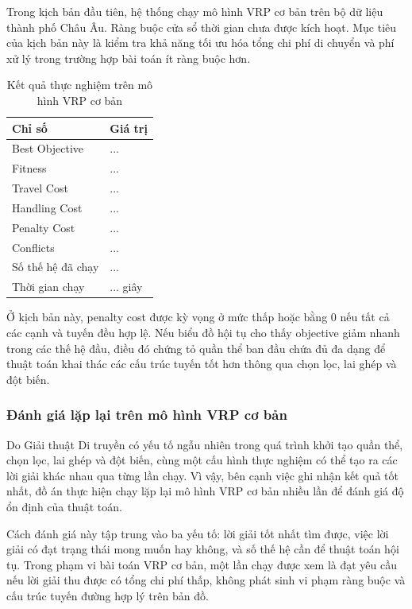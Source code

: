 \documentclass[12pt,a4paper]{article}
\numberwithin{figure}{subsection}
\begin{document}
Trong kịch bản đầu tiên, hệ thống chạy mô hình VRP cơ bản trên bộ dữ liệu thành phố Châu Âu. Ràng buộc cửa sổ thời gian chưa được kích hoạt. Mục tiêu của kịch bản này là kiểm tra khả năng tối ưu hóa tổng chi phí di chuyển và phí xử lý trong trường hợp bài toán ít ràng buộc hơn.

\begin{table}[H]
    \centering
    \caption{Kết quả thực nghiệm trên mô hình VRP cơ bản}
    \label{tab:basic_vrp_result}
    \renewcommand{\arraystretch}{1.35}
    \begin{tabular}{|p{6cm}|p{6cm}|}
        \hline
        \textbf{Chỉ số} & \textbf{Giá trị} \\
        \hline
        Best Objective & ... \\
        \hline
        Fitness & ... \\
        \hline
        Travel Cost & ... \\
        \hline
        Handling Cost & ... \\
        \hline
        Penalty Cost & ... \\
        \hline
        Conflicts & ... \\
        \hline
        Số thế hệ đã chạy & ... \\
        \hline
        Thời gian chạy & ... giây \\
        \hline
    \end{tabular}
\end{table}

Ở kịch bản này, penalty cost được kỳ vọng ở mức thấp hoặc bằng 0 nếu tất cả các cạnh và tuyến đều hợp lệ. Nếu biểu đồ hội tụ cho thấy objective giảm nhanh trong các thế hệ đầu, điều đó chứng tỏ quần thể ban đầu chứa đủ đa dạng để thuật toán khai thác các cấu trúc tuyến tốt hơn thông qua chọn lọc, lai ghép và đột biến.
\subsubsection{Đánh giá lặp lại trên mô hình VRP cơ bản}

Do Giải thuật Di truyền có yếu tố ngẫu nhiên trong quá trình khởi tạo quần thể, chọn lọc, lai ghép và đột biến, cùng một cấu hình thực nghiệm có thể tạo ra các lời giải khác nhau qua từng lần chạy. Vì vậy, bên cạnh việc ghi nhận kết quả tốt nhất, đồ án thực hiện chạy lặp lại mô hình VRP cơ bản nhiều lần để đánh giá độ ổn định của thuật toán.

Cách đánh giá này tập trung vào ba yếu tố: lời giải tốt nhất tìm được, việc lời giải có đạt trạng thái mong muốn hay không, và số thế hệ cần để thuật toán hội tụ. Trong phạm vi bài toán VRP cơ bản, một lần chạy được xem là đạt yêu cầu nếu lời giải thu được có tổng chi phí thấp, không phát sinh vi phạm ràng buộc và cấu trúc tuyến đường hợp lý trên bản đồ.
\end{document}
